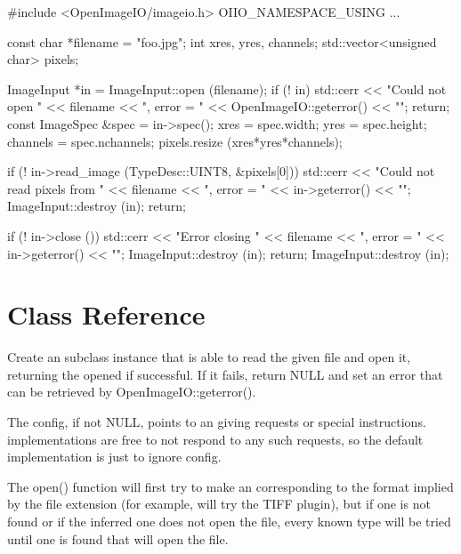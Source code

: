 \begin{code}
        #include <OpenImageIO/imageio.h>
        OIIO_NAMESPACE_USING
        ...

        const char *filename = "foo.jpg";
        int xres, yres, channels;
        std::vector<unsigned char> pixels;

        ImageInput *in = ImageInput::open (filename);
        if (! in) {
            std::cerr << "Could not open " << filename 
                      << ", error = " << OpenImageIO::geterror() << "\n";
            return;
        }
        const ImageSpec &spec = in->spec();
        xres = spec.width;
        yres = spec.height;
        channels = spec.nchannels;
        pixels.resize (xres*yres*channels);

        if (! in->read_image (TypeDesc::UINT8, &pixels[0])) {
            std::cerr << "Could not read pixels from " << filename 
                      << ", error = " << in->geterror() << "\n";
            ImageInput::destroy (in);
            return;
        }

        if (! in->close ()) {
            std::cerr << "Error closing " << filename 
                      << ", error = " << in->geterror() << "\n";
            ImageInput::destroy (in);
            return;
        }
        ImageInput::destroy (in);
\end{code}


\newpage
\section{\ImageInput Class Reference}
\label{sec:imageinput:reference}

Create an \ImageInput subclass instance that is able to read
the given file and open it, returning the opened \ImageInput if
successful.  If it fails, return {\cf NULL} and set an error that can
be retrieved by {\cf OpenImageIO::geterror()}.
    
The {\cf config}, if not {\cf NULL}, points to an \ImageSpec giving
requests or special instructions.  \ImageInput implementations
are free to not respond to any such requests, so the default
implementation is just to ignore config.
    
The {\cf open()} function will first try to make an \ImageInput
corresponding to the format implied by the file extension (for example,
 will try the TIFF plugin), but if one is not found or if
the inferred one does not open the file, every known \ImageInput type
will be tried until one is found that will open the file.
\apiend


